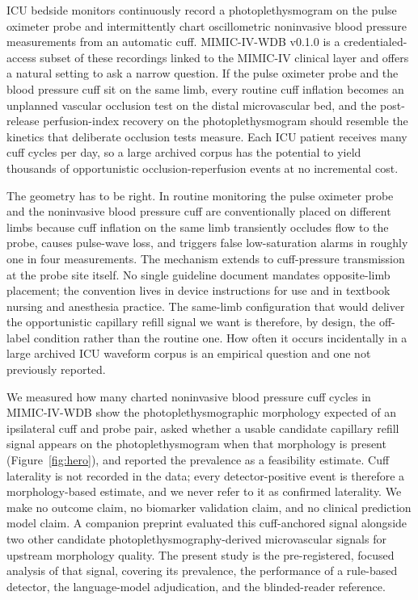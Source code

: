 \documentclass[twocolumn,letterpaper,10pt]{article}
\begin{document}
ICU bedside monitors continuously record a photoplethysmogram on the pulse oximeter probe and intermittently chart oscillometric noninvasive blood pressure measurements from an automatic cuff. MIMIC-IV-WDB v0.1.0\cite{moody2022_wdb} is a credentialed-access subset of these recordings linked to the MIMIC-IV clinical layer\cite{johnson2023_mimic4} and offers a natural setting to ask a narrow question. If the pulse oximeter probe and the blood pressure cuff sit on the same limb, every routine cuff inflation becomes an unplanned vascular occlusion test on the distal microvascular bed, and the post-release perfusion-index recovery on the photoplethysmogram should resemble the kinetics that deliberate occlusion tests measure. Each ICU patient receives many cuff cycles per day, so a large archived corpus has the potential to yield thousands of opportunistic occlusion-reperfusion events at no incremental cost.

The geometry has to be right. In routine monitoring the pulse oximeter probe and the noninvasive blood pressure cuff are conventionally placed on different limbs because cuff inflation on the same limb transiently occludes flow to the probe, causes pulse-wave loss, and triggers false low-saturation alarms in roughly one in four measurements.\cite{kitamoto2020_samesidecuff,sondej2022_cuff_spo2,kawagishi2004_oximeter_failuretimes} The mechanism extends to cuff-pressure transmission at the probe site itself.\cite{bucher1994_artifactual_oximetry} No single guideline document mandates opposite-limb placement; the convention lives in device instructions for use and in textbook nursing and anesthesia practice. The same-limb configuration that would deliver the opportunistic capillary refill signal we want is therefore, by design, the off-label condition rather than the routine one. How often it occurs incidentally in a large archived ICU waveform corpus is an empirical question and one not previously reported.

We measured how many charted noninvasive blood pressure cuff cycles in MIMIC-IV-WDB show the photoplethysmographic morphology expected of an ipsilateral cuff and probe pair, asked whether a usable candidate capillary refill signal appears on the photoplethysmogram when that morphology is present (Figure~\ref{fig:hero}), and reported the prevalence as a feasibility estimate. Cuff laterality is not recorded in the data; every detector-positive event is therefore a morphology-based estimate, and we never refer to it as confirmed laterality. We make no outcome claim, no biomarker validation claim, and no clinical prediction model claim. A companion preprint evaluated this cuff-anchored signal alongside two other candidate photoplethysmography-derived microvascular signals for upstream morphology quality.\cite{landry2026threesignal} The present study is the pre-registered, focused analysis of that signal, covering its prevalence, the performance of a rule-based detector, the language-model adjudication, and the blinded-reader reference.
\end{document}
